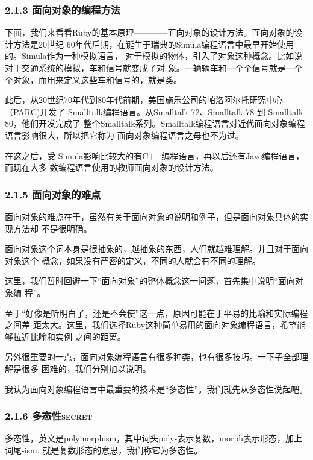 \documentclass[color=cyan,mathpazo,titlestyle=hang]{elegantbook}
\begin{document}
\subsubsection{2.1.3 面向对象的编程方法}
\label{sec:orgf59552b}

下面，我们来看看Ruby的基本原理————面向对象的设计方法。面向对象的设计方法是20世纪
60年代后期，在诞生于瑞典的Simula编程语言中最早开始使用的。Simula作为一种模拟语言，
对于模拟的物体，引入了对象这种概念。比如说对于交通系统的模拟，车和信号就变成了对
象。一辆辆车和一个个信号就是一个个对象，而用来定义这些车和信号的，就是类。

此后，从20世纪70年代到80年代前期，美国施乐公司的帕洛阿尔托研究中心（PARC)开发了
Smalltalk编程语言。从Smalltalk-72、Smalltalk-78 到 Smalltalk-80，他们开发完成了
整个Smalltalk系列。Smalltalk编程语言对近代面向对象编程语言影响很大，所以把它称为
面向对象编程语言之母也不为过。

在这之后，受 Simula影响比较大的有C++编程语言，再以后还有Jave编程语言，而现在大多
数编程语言使用的教师面向对象的设计方法。

\subsubsection{2.1.5 面向对象的难点}
\label{sec:orgf459526}

面向对象的难点在于，虽然有关于面向对象的说明和例子，但是面向对象具体的实现方法却
不是很明确。

面向对象这个词本身是很抽象的，越抽象的东西，人们就越难理解。并且对于面向对象这个
概念，如果没有严密的定义，不同的人就会有不同的理解。

这里，我们暂时回避一下“面向对象”的整体概念这一问题，首先集中说明“面向对象编
程”。

至于“好像是听明白了，还是不会使”这一点，原因可能在于平易的比喻和实际编程之间差
距太大。这里，我们选择Ruby这种简单易用的面向对象编程语言，希望能够拉近比喻和实例
之间的距离。

另外很重要的一点，面向对象编程语言有很多种类，也有很多技巧。一下子全部理解是很多
困难的，我们分别加以说明。

我认为面向对象编程语言中最重要的技术是“多态性”。我们就先从多态性说起吧。

\subsubsection{2.1.6 多态性\hfill{}\textsc{secret}}
\label{sec:org1c56f11}

多态性，英文是polymorphism，其中词头poly-表示复数，morph表示形态，加上词尾-ism,
就是复数形态的意思，我们称它为多态性。
\end{document}
